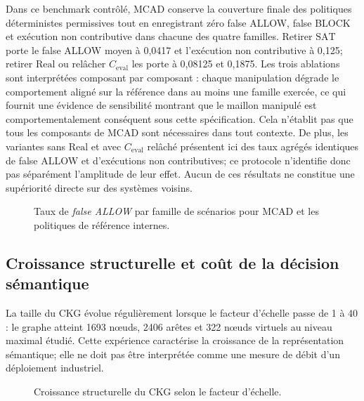 \documentclass[journal]{IEEEtran}
\begin{document}


Dans ce benchmark contrôlé, MCAD conserve la couverture finale des politiques déterministes permissives tout en enregistrant zéro false ALLOW, false BLOCK et exécution non contributive dans chacune des quatre familles. Retirer $\mathrm{SAT}$ porte le false ALLOW moyen à 0,0417 et l'exécution non contributive à 0,125; retirer $\mathrm{Real}$ ou relâcher $C_{\mathrm{eval}}$ les porte à 0,08125 et 0,1875. Les trois ablations sont interprétées composant par composant : chaque manipulation dégrade le comportement aligné sur la référence dans au moins une famille exercée, ce qui fournit une évidence de sensibilité montrant que le maillon manipulé est comportementalement conséquent sous cette spécification. Cela n'établit pas que tous les composants de MCAD sont nécessaires dans tout contexte. De plus, les variantes sans $\mathrm{Real}$ et avec $C_{\mathrm{eval}}$ relâché présentent ici des taux agrégés identiques de false ALLOW et d'exécutions non contributives; ce protocole n'identifie donc pas séparément l'amplitude de leur effet. Aucun de ces résultats ne constitue une supériorité directe sur des systèmes voisins.

\begin{figure}[!tb]
\centering

\caption{Taux de \emph{false ALLOW} par famille de scénarios pour MCAD et les politiques de référence internes.}
\label{fig:robustness-false-allow}
\end{figure}

\subsection{Croissance structurelle et coût de la décision sémantique}

La taille du CKG évolue régulièrement lorsque le facteur d'échelle passe de 1 à 40 : le graphe atteint 1693 nœuds, 2406 arêtes et 322 nœuds virtuels au niveau maximal étudié. Cette expérience caractérise la croissance de la représentation sémantique; elle ne doit pas être interprétée comme une mesure de débit d'un déploiement industriel.



\begin{figure}[!tb]
\centering

\caption{Croissance structurelle du CKG selon le facteur d'échelle.}
\label{fig:scalability}
\end{figure}
\end{document}
